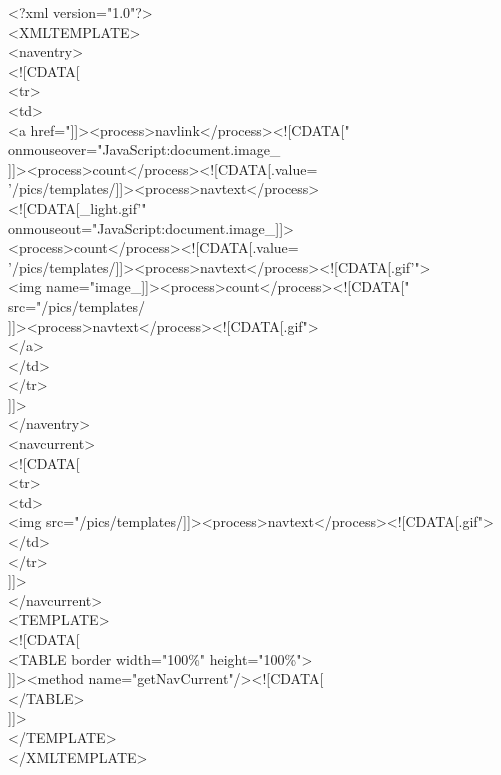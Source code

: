 \begin{xml}
<?xml version="1.0"?> \\
<XMLTEMPLATE> \\

<naventry> \\
<![CDATA[ \\
<tr> \\
\xtaba <td> \\
\xtabb   <a href="]]><process>navlink</process><![CDATA[" \\
\xtabc   onmouseover="JavaScript:document.image\_ \\
\xtabc   ]]><process>count</process><![CDATA[.value= \\
\xtabc   '/pics/templates/]]><process>navtext</process> \\
\xtabc   <![CDATA[\_light.gif'" \\
\xtabc   onmouseout="JavaScript:document.image\_]]> \\
\xtabc   <process>count</process><![CDATA[.value= \\
\xtabc   '/pics/templates/]]><process>navtext</process><![CDATA[.gif'"> \\
\xtabc   <img name="image\_]]><process>count</process><![CDATA[" \\
\xtabc   src="/pics/templates/ \\
\xtabc   ]]><process>navtext</process><![CDATA[.gif"> \\
\xtabb   </a> \\
\xtaba </td> \\
</tr> \\
]]> \\
</naventry> \\

<navcurrent> \\
<![CDATA[ \\
<tr> \\
\xtaba  <td> \\
\xtabb    <img src="/pics/templates/]]><process>navtext</process><![CDATA[.gif"> \\
\xtaba  </td> \\
</tr> \\
]]> \\
</navcurrent> \\

<TEMPLATE> \\
<![CDATA[ \\
<TABLE border width="100\%" height="100\%"> \\
\xtaba  ]]><method name="getNavCurrent"/><![CDATA[ \\
</TABLE> \\
]]> \\
</TEMPLATE> \\

</XMLTEMPLATE> \\
\end{xml}


